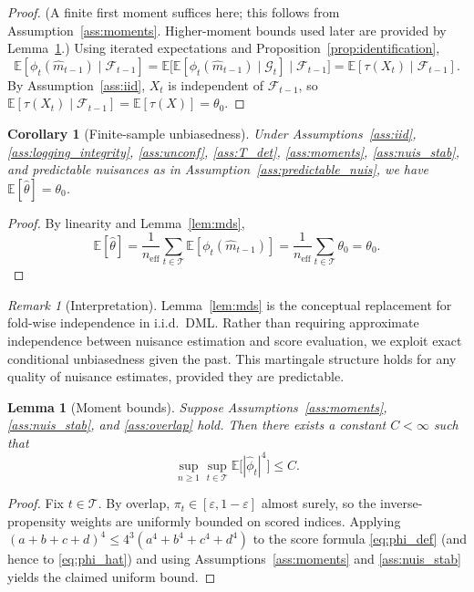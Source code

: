 \documentclass[11pt]{article}
\numberwithin{equation}{section}
\theoremstyle{plain}
\newtheorem{lemma}[theorem]{Lemma}
\newtheorem{corollary}[theorem]{Corollary}
\theoremstyle{definition}
\theoremstyle{remark}
\newtheorem{remark}[theorem]{Remark}
\newcommand{\E}{\mathbb{E}}
\newcommand{\cF}{\mathcal{F}}
\newcommand{\cG}{\mathcal{G}}
\newcommand{\pit}{\pi_t}
\begin{document}
\begin{proof}
(A finite first moment suffices here; this follows from Assumption~\ref{ass:moments}. Higher-moment bounds used later are provided by Lemma~\ref{lem:moment_bounds}.)
Using iterated expectations and Proposition~\ref{prop:identification},
\[
\E[\phi_t(\widehat m_{t-1})\mid \cF_{t-1}]
=
\E\!\big[\E[\phi_t(\widehat m_{t-1})\mid \cG_t]\mid \cF_{t-1}\big]
=
\E[\tau(X_t)\mid \cF_{t-1}].
\]
By Assumption~\ref{ass:iid}, $X_t$ is independent of $\cF_{t-1}$, so $\E[\tau(X_t) \mid \cF_{t-1}] = \E[\tau(X)] = \theta_0$.
\end{proof}

\begin{corollary}[Finite-sample unbiasedness]\label{cor:unbiased}
Under Assumptions~\ref{ass:iid}, \ref{ass:logging_integrity}, \ref{ass:unconf}, \ref{ass:T_det}, \ref{ass:moments}, \ref{ass:nuis_stab}, and predictable nuisances as in Assumption~\ref{ass:predictable_nuis}, we have $\E[\widehat{\theta}]=\theta_0$.
\end{corollary}

\begin{proof}
By linearity and Lemma~\ref{lem:mds},
\[
\E[\widehat\theta]
=
\frac{1}{n_{\mathrm{eff}}}\sum_{t\in\mathcal{T}}
\E[\phi_t(\widehat m_{t-1})]
=
\frac{1}{n_{\mathrm{eff}}}\sum_{t\in\mathcal{T}} \theta_0
=
\theta_0.
\]
\end{proof}

\begin{remark}[Interpretation]\label{rem:mds_interpretation}
Lemma~\ref{lem:mds} is the conceptual replacement for fold-wise independence in i.i.d.\ DML. Rather than requiring approximate independence between nuisance estimation and score evaluation, we exploit exact conditional unbiasedness given the past. This martingale structure holds for any quality of nuisance estimates, provided they are predictable.
\end{remark}

\begin{lemma}[Moment bounds]\label{lem:moment_bounds}
Suppose Assumptions~\ref{ass:moments}, \ref{ass:nuis_stab}, and \ref{ass:overlap} hold. Then there exists a constant $C<\infty$ such that
\[
\sup_{n\ge 1}\sup_{t\in\mathcal{T}} \E\big[|\widehat\phi_t|^4\big]\le C.
\]
\end{lemma}
\begin{proof}
Fix $t\in\mathcal{T}$. By overlap, $\pit\in[\varepsilon,1-\varepsilon]$ almost surely, so the inverse-propensity weights are uniformly bounded on scored indices. Applying $(a+b+c+d)^4\le 4^3(a^4+b^4+c^4+d^4)$ to the score formula \eqref{eq:phi_def} (and hence to \eqref{eq:phi_hat}) and using Assumptions~\ref{ass:moments} and \ref{ass:nuis_stab} yields the claimed uniform bound.
\end{proof}
\end{document}
